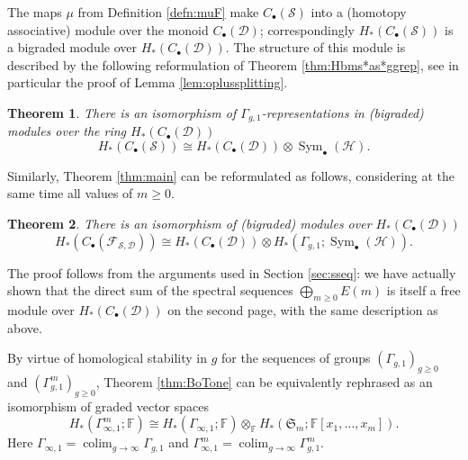 \documentclass{amsart}
\theoremstyle{plain}
\newtheorem{thm}{Theorem}[section]
\theoremstyle{definition}
\newcommand{\D}{\mathcal{D}}
\newcommand{\F}{\mathbb{F}}
\newcommand{\cF}{\mathcal{F}}
\renewcommand{\H}{\mathcal{H}}
\renewcommand{\S}{\mathcal{S}}
\renewcommand{\gg}{\Gamma_{g,1}}
\newcommand{\ggm}{\gg^m}
\newcommand{\pa}[1]{\left(#1\right)}
\DeclareMathOperator{\Sym}{Sym}
\def\colim{\mathop{\mathrm{colim}}\nolimits}
\begin{document}
The maps $\mu$ from Definition \ref{defn:muF} make $C_{\bullet}(\S)$ into a (homotopy associative)
module over the monoid $C_{\bullet}(\D)$; correspondingly $H_*\pa{C_{\bullet}(\S)}$ is a bigraded
module over $H_*\pa{C_{\bullet}(\D)}$. The structure of this module is described by the following
reformulation of Theorem \ref{thm:Hbms*as*ggrep}, see in particular the proof of Lemma \ref{lem:oplussplitting}.

\begin{thm}
 \label{thm:firstreformulation}
 There is an isomorphism of $\gg$-representations in (bigraded) modules over the ring $H_*\pa{C_{\bullet}(\D)}$
 \[
  H_*\pa{C_{\bullet}(\S)}\cong   H_*\pa{C_{\bullet}(\D)}\otimes\Sym_{\bullet}(\H).
 \]
\end{thm}

Similarly, Theorem \ref{thm:main} can be reformulated as follows, considering at the same time all values of $m\geq 0$.
\begin{thm}
 \label{thm:mainreformulation}
 There is an isomorphism of (bigraded) modules over $H_*\pa{C_{\bullet}(\D)}$
 \[
 H_*\pa{C_{\bullet}(\cF_{\S,\D})}\cong   H_*\pa{C_{\bullet}(\D)}\otimes H_*\pa{\gg;\Sym_{\bullet}(\H)}.
 \] 
\end{thm}
The proof follows from the arguments used in Section \ref{sec:sseq}: we have actually shown that the direct
sum of the spectral sequences $\bigoplus_{m\geq 0} E(m)$ is itself a free module over $H_*\pa{C_{\bullet}(\D)}$
on the second page, with the same description as above.

By virtue of homological stability in $g$ for the sequences of groups $\pa{\gg}_{g\geq 0}$ and 
$\pa{\ggm}_{g\geq 0}$, Theorem \ref{thm:BoTone} can be equivalently rephrased as an isomorphism of graded vector spaces
\[
  H_*\pa{\Gamma_{\infty,1}^m;\F}\cong H_*\pa{\Gamma_{\infty,1};\F}\otimes_{\F} H_*\pa{\mathfrak{S}_m;\F[x_1,\dots,x_m]}.
\]
Here $\Gamma_{\infty,1}=\colim_{g\to\infty}\gg$ and $\Gamma_{\infty,1}^m=\colim_{g\to\infty}\ggm$.
\end{document}

